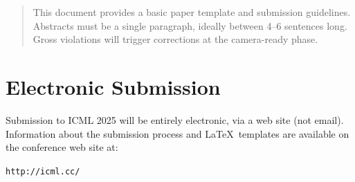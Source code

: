 \documentclass{article}
\theoremstyle{plain}
\theoremstyle{definition}
\theoremstyle{remark}
\begin{document}
\printAffiliationsAndNotice{\icmlEqualContribution} %

\begin{abstract}
  This document provides a basic paper template and submission guidelines.
  Abstracts must be a single paragraph, ideally between 4--6 sentences long.
  Gross violations will trigger corrections at the camera-ready phase.
\end{abstract}

\section{Electronic Submission}
\label{submission}

Submission to ICML 2025 will be entirely electronic, via a web site
(not email). Information about the submission process and \LaTeX\ templates
are available on the conference web site at:
\begin{center}
  \texttt{http://icml.cc/}
\end{center}
\end{document}
